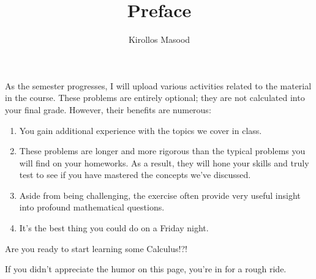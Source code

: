 \documentclass{ximera}
\title{Preface}
\author{Kirollos Masood}
\begin{document}
\begin{abstract}
\end{abstract}
\maketitle

\begin{sectionOutcomes}
	As the semester progresses, I will upload various activities related to the material in the course. These problems are entirely optional; they are not calculated into your final grade. However, their benefits are numerous:
	\begin{enumerate}
		
		\item
		You gain additional experience with the topics we cover in class.
		
		\item
		These problems are longer and more rigorous than the typical problems you will find on your homeworks. As a result, they will hone your skills and truly test to see if you have mastered the concepts we've discussed.
		
		\item
		Aside from being challenging, the exercise often provide very useful insight into profound mathematical questions.
		
		\item
		It's the best thing you could do on a Friday night.
		
	\end{enumerate}
	
\end{sectionOutcomes}

\begin{exercise}
	Are you ready to start learning some Calculus!?!
	\begin{multipleChoice}
	\end{multipleChoice}
	\begin{hint}
		If you didn't appreciate the humor on this page, you're in for a rough ride.
	\end{hint}
\end{exercise}
\end{document}
